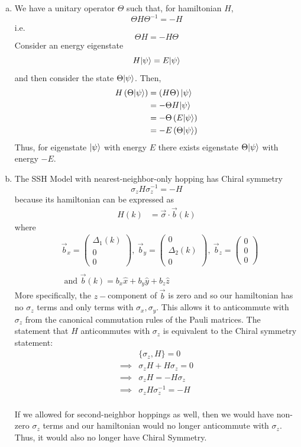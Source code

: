 \documentclass[11pt]{article}
\begin{document}
\begin{enumerate}[(a).]
  \item We have a unitary operator $\Theta$ such that, for hamiltonian $H$, $$ \Theta H \Theta^{-1} = -H $$ i.e. $$ \Theta H = -H\Theta $$ Consider an energy eigenstate $$ H\lvert\psi\rangle = E \lvert\psi\rangle $$ and then consider the state $\Theta \lvert\psi\rangle$. Then,
  \begin{align*}
    H \left( \Theta \lvert\psi\rangle \right) &= \left(H \Theta\right)\lvert\psi\rangle \\
    &= -\Theta H \lvert\psi\rangle \\
    &= -\Theta\left(E \lvert\psi\rangle\right) \\
    &= -E \left( \Theta \lvert\psi\rangle \right)
  \end{align*}
  Thus, for eigenstate $\lvert\psi\rangle$ with energy $E$ there exists eigenstate $\Theta \lvert\psi\rangle$ with energy $-E$.
  
  \item The SSH Model with nearest-neighbor-only hopping has Chiral symmetry $$ \sigma_z H \sigma_z^{-1} = -H $$ because its hamiltonian can be expressed as \begin{align*}
    H(k) &= \vec{\sigma} \cdot \vec{b}(k)
  \end{align*}
  where \begin{align*}
    &\vec{b}_x = \begin{pmatrix}
      \Delta_1(k) \\ 0 \\ 0
    \end{pmatrix}, ~\vec{b}_y = \begin{pmatrix}
      0 \\ \Delta_2(k) \\ 0
    \end{pmatrix}, ~\vec{b}_z = \begin{pmatrix}
      0\\ 0 \\ 0
    \end{pmatrix} \\
    \\
    &\text{ and } \vec{b}(k) = b_x \hat{x} + b_y \hat{y} + b_z \hat{z}
  \end{align*} More specifically, the $z-$component of $\vec{b}$ is zero and so our hamiltonian has no $\sigma_z$ terms and only terms with $\sigma_x, \sigma_y$. This allows it to anticommute with $\sigma_z$ from the canonical commutation rules of the Pauli matrices. The statement that $H$ anticommutes with $\sigma_z$ is equivalent to the Chiral symmetry statement:
  \begin{align*}
    &\{\sigma_z, H \} = 0 \\
    \implies& \sigma_z H + H \sigma_z = 0 \\
    \implies& \sigma_z H = - H \sigma_z \\
    \implies& \sigma_z H \sigma_z^{-1} = - H
  \end{align*}  \\
  If we allowed for second-neighbor hoppings as well, then we would have non-zero $\sigma_z$ terms and our hamiltonian would no longer anticommute with $\sigma_z$. Thus, it would also no longer have Chiral Symmetry.
\end{enumerate}
\end{document}
